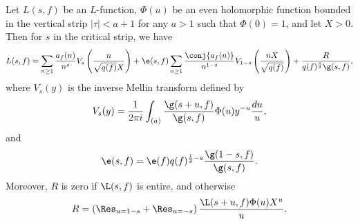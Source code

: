     \begin{theorem}
      Let $L(s,f)$ be an $L$-function, $\Phi(u)$ be an even holomorphic function bounded in the vertical strip $|\tau| < a+1$ for any $a > 1$ such that $\Phi(0) = 1$, and let $X > 0$. Then for $s$ in the critical strip, we have
      \[
        L(s,f) = \sum_{n \ge 1}\frac{a_{f}(n)}{n^{s}}V_{s}\left(\frac{n}{\sqrt{q(f)}X}\right)+\e(s,f)\sum_{n \ge 1}\frac{\conj{a_{f}(n)}}{n^{1-s}}V_{1-s}\left(\frac{nX}{\sqrt{q(f)}}\right)+\frac{R}{q(f)^{\frac{s}{2}}\g(s,f)},
      \]
      where $V_{s}(y)$ is the inverse Mellin transform defined by
      \[
        V_{s}(y) = \frac{1}{2\pi i}\int_{(a)}\frac{\g(s+u,f)}{\g(s,f)}\Phi(u)y^{-u}\frac{du}{u},
      \]
      and
      \[
        \e(s,f) = \e(f)q(f)^{\frac{1}{2}-s}\frac{\g(1-s,f)}{\g(s,f)}.
      \]
      Moreover, $R$ is zero if $\L(s,f)$ is entire, and otherwise
      \[
        R = \left(\Res_{u = 1-s}+\Res_{u = -s}\right)\frac{\L(s+u,f)\Phi(u)X^{u}}{u}.
      \]
    \end{theorem}
